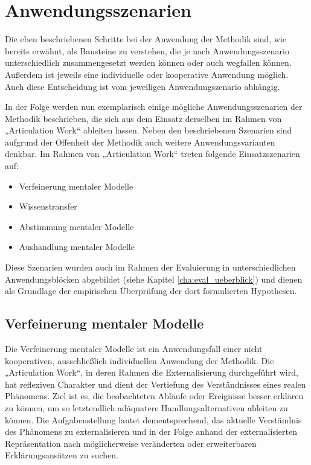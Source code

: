 
\section{Anwendungsszenarien}

Die eben beschriebenen Schritte bei der Anwendung der Methodik sind, wie bereits erwähnt, als Bausteine zu verstehen, die je nach Anwendungsszenario unterschiedlich zusammengesetzt werden können oder auch wegfallen können. Außerdem ist jeweils eine individuelle oder kooperative Anwendung möglich. Auch diese Entscheidung ist vom jeweiligen Anwendungszenario abhängig.

In der Folge werden nun exemplarisch einige mögliche Anwendungsszenarien der Methodik beschrieben, die sich aus dem Einsatz derselben im Rahmen von „Articulation Work“ ableiten lassen. Neben den beschriebenen Szenarien sind aufgrund der Offenheit der Methodik auch weitere Anwendungsvarianten denkbar. Im Rahmen von „Articulation Work“ treten folgende Einsatzszenarien auf:

\begin{itemize}
 \item Verfeinerung mentaler Modelle
 \item Wissenstransfer
 \item Abstimmung mentaler Modelle 
 \item Aushandlung mentaler Modelle
\end{itemize}

Diese Szenarien wurden auch im Rahmen der Evaluierung in unterschiedlichen Anwendungsblöcken abgebildet (siehe Kapitel \ref{cha:eval_ueberblick}) und dienen als Grundlage der empirischen Überprüfung der dort formulierten Hypothesen.

\subsection{Verfeinerung mentaler Modelle} %
\label{sub:verfeinerung_individueller_mentaler_modelle}

Die Verfeinerung mentaler Modelle ist ein Anwendungsfall einer nicht kooperativen, ausschließlich individuellen Anwendung der Methodik. Die „Articulation Work“, in deren Rahmen die Externalisierung durchgeführt wird, hat reflexiven Charakter und dient der Vertiefung des Verständnisses eines realen Phänomens. Ziel ist es, die beobachteten Abläufe oder Ereignisse besser erklären zu können, um so letztendlich adäquatere Handlungsalternativen ableiten zu können. Die Aufgabenstellung lautet dementsprechend, das aktuelle Verständnis des Phänomens zu externalisieren und in der Folge anhand der externalisierten Repräsentation nach möglicherweise veränderten oder erweiterbaren Erklärungsansätzen zu suchen.

